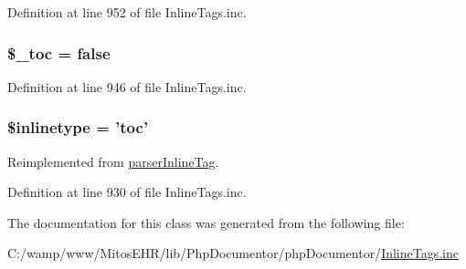 \-Definition at line 952 of file \-Inline\-Tags.\-inc.

\hypertarget{classparser_toc_inline_tag_a89239c7c6ac8aca36371eeec9753c130}{
\subsubsection[{\$\-\_\-toc}]{\setlength{\rightskip}{0pt plus 5cm}\$\-\_\-toc = false}}\label{classparser_toc_inline_tag_a89239c7c6ac8aca36371eeec9753c130}


\-Definition at line 946 of file \-Inline\-Tags.\-inc.

\hypertarget{classparser_toc_inline_tag_a7583c1b3912b7afa3f038eb353a6ad97}{
\subsubsection[{\$inlinetype}]{\setlength{\rightskip}{0pt plus 5cm}\$inlinetype = 'toc'}}\label{classparser_toc_inline_tag_a7583c1b3912b7afa3f038eb353a6ad97}


\-Reimplemented from \hyperlink{classparser_inline_tag_a7583c1b3912b7afa3f038eb353a6ad97}{parser\-Inline\-Tag}.



\-Definition at line 930 of file \-Inline\-Tags.\-inc.



\-The documentation for this class was generated from the following file\-:\begin{DoxyCompactItemize}
\item 
\-C\-:/wamp/www/\-Mitos\-E\-H\-R/lib/\-Php\-Documentor/php\-Documentor/\hyperlink{_inline_tags_8inc}{\-Inline\-Tags.\-inc}\end{DoxyCompactItemize}
